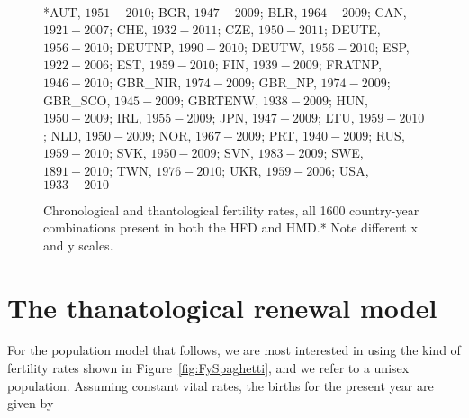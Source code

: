 \documentclass{article}
\begin{document}
\begin{figure}[h!]
	\caption{Chronological and thantological fertility rates, all 1600
	country-year combinations present in both the HFD and HMD.* Note different x
	and y scales.}
	\label{fig:Fxcompare}
	\begin{center}
	\\
	\end{center}
	\begin{tiny}
	*AUT, $1951-2010$; BGR, $1947-2009$; BLR, $1964-2009$; CAN, $1921-2007$; 
	CHE, $1932-2011$; CZE, $1950-2011$; DEUTE, $1956-2010$; DEUTNP, $1990-2010$; 
	DEUTW, $1956-2010$; ESP, $1922-2006$; EST, $1959-2010$; FIN, $1939-2009$; 
	FRATNP, $1946-2010$; GBR\_NIR, $1974-2009$; GBR\_NP, $1974-2009$; GBR\_SCO,
	$1945-2009$; GBRTENW, $1938-2009$; HUN, $1950-2009$; IRL, $1955-2009$; JPN, $1947-2009$; 
	LTU, $1959-2010$; NLD, $1950-2009$; NOR, $1967-2009$; PRT, $1940-2009$; 
	RUS, $1959-2010$; SVK, $1950-2009$; SVN, $1983-2009$; SWE, $1891-2010$; 
	TWN, $1976-2010$; UKR, $1959-2006$; USA, $1933-2010$
	\end{tiny}
\end{figure}

\section*{The thanatological renewal model}
For the population model that follows, we are most interested in using the kind
of fertility rates shown in Figure~\ref{fig:FySpaghetti}, and we refer to a
unisex population. Assuming constant vital rates, the births for the present year are given by
\end{document}
